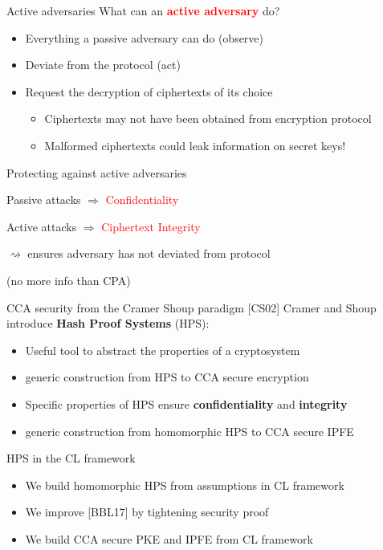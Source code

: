\begin{frame}{Active adversaries}
What can an \textbf{\textcolor{red}{active adversary}} do?
\begin{itemize}
\item Everything a passive adversary can do (observe)
\item Deviate from the protocol (act)
\item[$\Rightarrow$] Request the decryption of ciphertexts of its choice
\begin{itemize}
\item Ciphertexts may not have been obtained from encryption protocol
\item Malformed ciphertexts could leak information on secret keys!
\end{itemize}
\end{itemize}
\end{frame}

\begin{frame}{Protecting against active adversaries}
\begin{center}
Passive attacks $\Rightarrow$ \textcolor{red}{Confidentiality}
\end{center}
\begin{center}
Active attacks $\Rightarrow$ \textcolor{red}{Ciphertext Integrity}

$\rightsquigarrow$ ensures adversary has not deviated from protocol

(no more info than CPA)
\end{center}
\end{frame}

\begin{frame}{CCA security from the Cramer Shoup paradigm [CS02]}
Cramer and Shoup introduce \textbf{Hash Proof Systems} (HPS):
\begin{itemize}
\item[-] Useful tool to abstract the properties of a cryptosystem
\item[-] [CS02] generic construction from HPS to CCA secure encryption
\item[-] Specific properties of HPS ensure \textbf{confidentiality} and \textbf{integrity}
\item[-] [BBL17] generic construction from homomorphic HPS to CCA secure IPFE
\end{itemize}
\end{frame}

\begin{frame}{HPS in the CL framework}
\begin{itemize}
\item We build homomorphic HPS from assumptions in CL framework
\item We improve [BBL17] by tightening security proof
\item We build CCA secure PKE and IPFE from CL framework
\end{itemize}
\end{frame}